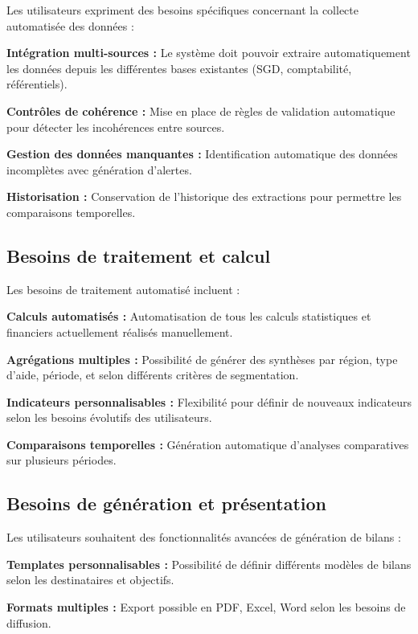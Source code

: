 Les utilisateurs expriment des besoins spécifiques concernant la collecte automatisée des données :

\medskip

\textbf{Intégration multi-sources :} Le système doit pouvoir extraire automatiquement les données depuis les différentes bases existantes (SGD, comptabilité, référentiels).

\textbf{Contrôles de cohérence :} Mise en place de règles de validation automatique pour détecter les incohérences entre sources.

\textbf{Gestion des données manquantes :} Identification automatique des données incomplètes avec génération d'alertes.

\textbf{Historisation :} Conservation de l'historique des extractions pour permettre les comparaisons temporelles.

\subsection{Besoins de traitement et calcul}

Les besoins de traitement automatisé incluent :

\medskip

\textbf{Calculs automatisés :} Automatisation de tous les calculs statistiques et financiers actuellement réalisés manuellement.

\textbf{Agrégations multiples :} Possibilité de générer des synthèses par région, type d'aide, période, et selon différents critères de segmentation.

\textbf{Indicateurs personnalisables :} Flexibilité pour définir de nouveaux indicateurs selon les besoins évolutifs des utilisateurs.

\textbf{Comparaisons temporelles :} Génération automatique d'analyses comparatives sur plusieurs périodes.

\subsection{Besoins de génération et présentation}

Les utilisateurs souhaitent des fonctionnalités avancées de génération de bilans :

\medskip

\textbf{Templates personnalisables :} Possibilité de définir différents modèles de bilans selon les destinataires et objectifs.

\textbf{Formats multiples :} Export possible en PDF, Excel, Word selon les besoins de diffusion.

